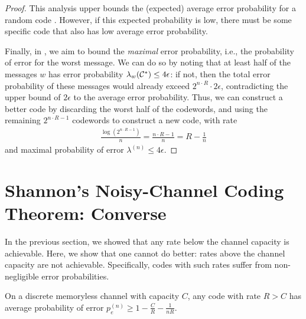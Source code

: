 \begin{proof}
This analysis upper bounds the (expected) average error probability for a random code \cran. However, if this expected probability is low, there must be some specific code \cspec that also has low average error probability.

Finally, in \cspec, we aim to bound the \emph{maximal} error probability, i.e., the probability of error for the worst message. We can do so by noting that at least half of the messages $w$ has error probability $\lambda_w(\mathcal{C}^*) \leq 4 \epsilon$: if not, then the total error probability of these messages would already exceed $2^{n \cdot R} \cdot 2\epsilon$, contradicting the upper bound of $2 \epsilon$ to the average error probability. Thus, we can construct a better code by discarding the worst half of the codewords, and using the remaining $2^{n \cdot R - 1}$ codewords to construct a new code, with rate
\begin{align}
\frac{\log(2^{n\cdot R - 1})}{n} = \frac{n \cdot R - 1}{n} = R - \frac{1}{n}
\end{align}
and maximal probability of error $\lambda^{(n)} \leq 4 \epsilon$.
\end{proof}

\section{Shannon's Noisy-Channel Coding Theorem: Converse}
In the previous section, we showed that any rate below the channel capacity is achievable. Here, we show that one cannot do better: rates above the channel capacity are not achievable. Specifically, codes with such rates suffer from non-negligible error probabilities. 

\begin{theorem}\label{thm:ncc-backward}
On a discrete memoryless channel with capacity $C$, any code with rate $R > C$ has average probability of error $p_e^{(n)} \geq 1 - \frac{C}{R} - \frac{1}{nR}$.
\end{theorem}

